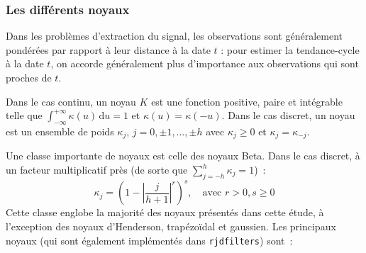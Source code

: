 \documentclass[
  12pt,
  a4paper,french]{article}
\newcommand\1{\mathds{1}}
\newcommand\ud{\,\mathrm{d}}
\begin{document}
\hypertarget{sec-kernels}{%
\subsubsection{Les différents noyaux}\label{sec-kernels}}

Dans les problèmes d'extraction du signal, les observations sont généralement pondérées par rapport à leur distance à la date \(t\) : pour estimer la tendance-cycle à la date \(t\), on accorde généralement plus d'importance aux observations qui sont proches de \(t\).

Dans le cas continu, un noyau \(K\) est une fonction positive, paire et intégrable telle que \(\int_{-\infty}^{+\infty}\kappa(u) \ud u=1\) et \(\kappa(u)=\kappa(-u)\).
Dans le cas discret, un noyau est un ensemble de poids \(\kappa_j\), \(j=0,\pm1,\dots,\pm h\) avec \(\kappa_j \geq0\) et \(\kappa_j=\kappa_{-j}\).

Une classe importante de noyaux est celle des noyaux Beta.
Dans le cas discret, à un facteur multiplicatif près (de sorte que \(\sum_{j=-h}^h\kappa_j=1\))~:
\[
\kappa_j = \left(
  1-
  \left\lvert
  \frac j {h+1}
  \right\lvert^r
\right)^s,\quad\text{avec }r>0,s\geq 0
\]
Cette classe englobe la majorité des noyaux présentés dans cette étude, à l'exception des noyaux d'Henderson, trapézoïdal et gaussien.
Les principaux noyaux (qui sont également implémentés dans \texttt{rjdfilters}) sont~:
\end{document}
